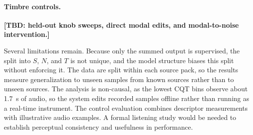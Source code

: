 \paragraph{Timbre controls.}
\textbf{[TBD: held-out knob sweeps, direct modal edits, and modal-to-noise intervention.]}

Several limitations remain.
Because only the summed output is supervised, the split into $S$, $N$, and $T$ is not unique, and the model structure biases this split without enforcing it.
The data are split within each source pack, so the results measure generalization to unseen samples from known sources rather than to unseen sources.
The analysis is non-causal, as the lowest CQT bins observe about 1.7~s of audio, so the system edits recorded samples offline rather than running as a real-time instrument.
The control evaluation combines descriptor measurements with illustrative audio examples.
A formal listening study would be needed to establish perceptual consistency and usefulness in performance.
